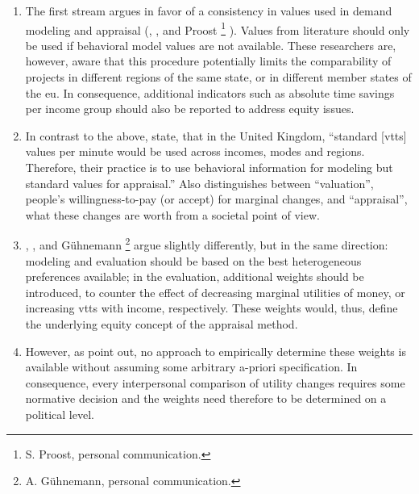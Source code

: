 \begin{enumerate}\styleEnumerate
%
\item The first stream argues in favor of a consistency in values used in demand modeling and appraisal 
(\citet[p.255]{Grant-MullerEtAl2001EconomicTransportAppraisalRevisited}, \citet[p.S4 and p.S8]{HEATCO2006Delivrable5}, and Proost%
%
\footnote{
%
S. Proost, personal communication.
%
}%
%
).
%
%
Values from literature should only be used if behavioral model values are not available. These researchers are, however, aware that this procedure potentially limits the comparability of projects in different regions of the same state, or in different member states of the \gls{eu}.
%
In consequence, additional indicators such as absolute time savings per income group should also be reported to address equity issues.
%
\item In contrast to the above, \citet[p.12]{MackieWorsley2013ComparisonTransportAppraisal} state, that in the United Kingdom, \enquote{standard [\gls{vtts}] values per minute would be used across incomes, modes and regions. Therefore, their practice is to use behavioral information for modeling but standard values for appraisal.} Also \citet{Daly2013hEARTKeynote} distinguishes between ``valuation'', \ie people's willingness-to-pay (or accept) for marginal changes, and ``appraisal'', \ie what these changes are worth from a societal point of view.
%
\item \label{lbl:weights} \citet{Fowkes2010ValueOfTTS}, \citet{OECD2006CBA}, and G\"uhnemann%
%
\footnote{
%
A. G\"uhnemann, personal communication.
%
}
%
argue slightly differently, but in the same direction: modeling and evaluation should be based on the best heterogeneous preferences available; in the evaluation, additional weights should be introduced, \eg to counter the effect of decreasing marginal utilities of money, or increasing \gls{vtts} with income, respectively. These weights would, thus, define the underlying equity concept of the appraisal method.
%
\item However, as \citet{AhlheimRose1989MessungIndividuellerWohlfahrt} point out, no approach to empirically determine these weights is available without assuming some arbitrary a-priori specification.
%
%
%
In consequence, every interpersonal comparison of utility changes requires some normative decision and the weights need therefore to be determined on a political level.
%
\end{enumerate}


